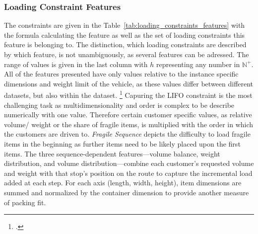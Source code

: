 \subsubsection{Loading Constraint Features}

The constraints are given in the Table~\ref{tab:loading_constraints_features} with the formula calculating the feature as well as the set of
loading constraints this feature is belonging to. The distinction, which loading constraints are described by which feature, is not
unambiguously, as several features can be adressed. The range of values is given in the last column with $h$ representing any number in $\mathbb{N}^{+}$.
All of the features presented have only values relative to the instance specific dimensions and weight limit of the vehicle, as these values
differ between different datasets, but also within the \gendreauDataSetText dataset. \footcite[cf.][p. 346]{gendreau_tabu_2006}
Capuring the \gls{LIFO} constraint is the most challenging task as multidimensionality and order is complex to be describe numerically
with one value. Therefore certain customer specific values, as relative volume/ weight or the share of fragile items, is multiplied
with the order in which the customers are driven to. \textit{Fragile Sequence} depicts the difficulty to load fragile items
in the beginning as further items need to be likely placed upon the first items. The three sequence-dependent features—volume balance,
weight distribution, and volume distribution—combine each customer’s requested volume and weight with that stop’s position on
the route to capture the incremental load added at each step. For each axis (length, width, height), item dimensions are
summed and normalized by the container dimension to provide another measure of packing fit.
